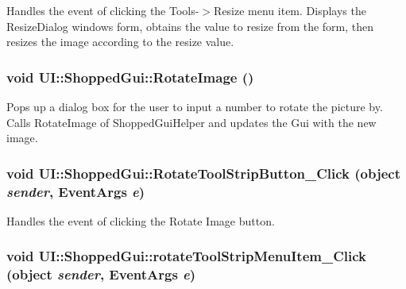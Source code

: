 \label{class_u_i_1_1_shopped_gui_a05e2b57477f10f88b1ee06b6b5aa4d86}
Handles the event of clicking the Tools-\/$>$Resize menu item. Displays the ResizeDialog windows form, obtains the value to resize from the form, then resizes the image according to the resize value. \hypertarget{class_u_i_1_1_shopped_gui_a5558e1154a550f8a8717a4e6240c0614}{
\subsubsection[{RotateImage}]{\setlength{\rightskip}{0pt plus 5cm}void UI::ShoppedGui::RotateImage ()}}
\label{class_u_i_1_1_shopped_gui_a5558e1154a550f8a8717a4e6240c0614}
Pops up a dialog box for the user to input a number to rotate the picture by. Calls RotateImage of ShoppedGuiHelper and updates the Gui with the new image. \hypertarget{class_u_i_1_1_shopped_gui_ab00cf3db4aed9cacee4e7d5ff261509b}{
\subsubsection[{RotateToolStripButton\_\-Click}]{\setlength{\rightskip}{0pt plus 5cm}void UI::ShoppedGui::RotateToolStripButton\_\-Click (object {\em sender}, \/  EventArgs {\em e})}}
\label{class_u_i_1_1_shopped_gui_ab00cf3db4aed9cacee4e7d5ff261509b}
Handles the event of clicking the Rotate Image button. \hypertarget{class_u_i_1_1_shopped_gui_a8b4824c0552bcfe814bbf8437cb87ec2}{
\subsubsection[{rotateToolStripMenuItem\_\-Click}]{\setlength{\rightskip}{0pt plus 5cm}void UI::ShoppedGui::rotateToolStripMenuItem\_\-Click (object {\em sender}, \/  EventArgs {\em e})}}

